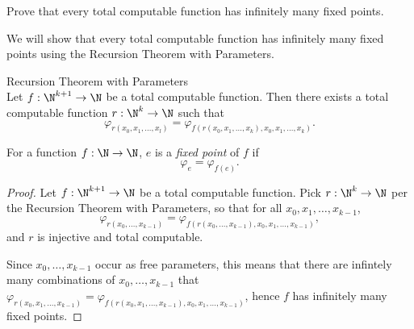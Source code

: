 \begin{problem}
  Prove that every total computable function has
  infinitely many fixed points.

  \begin{answer}

    We will show that every total computable function has infinitely many fixed points
    using the Recursion Theorem with Parameters.

    \begin{theorem}{Recursion Theorem with Parameters} \\
      Let $f : \N^{k+1} \to \N$ be a total computable function.
      Then there exists a total computable function $r : \N^k \to \N$ such that
      \[
        \varphi_{r(x_0, x_1, \ldots, x_l)} = \varphi_{f(r(x_0, x_1, \ldots, x_k), x_0, x_1, \ldots, x_k)}.
      \]
    \end{theorem}


    \begin{definition}
      For a function $f : \N \to \N$, $e$ is a \emph{fixed point} of $f$
      if \[ \varphi_e = \varphi_{f(e)}. \]
    \end{definition}


    \begin{proof}
      Let $f : \N^{k+1} \to \N$ be a total computable function.
      Pick $r : \N^k \to \N$ per the Recursion Theorem with Parameters,
      so that for all $x_0, x_1, \ldots, x_{k-1}$,
      \[
        \varphi_{r(x_0, \ldots, x_{k-1})} = \varphi_{f(r(x_0, \ldots, x_{k-1}), x_0, x_1, \ldots, x_{k-1})},
      \]
      and $r$ is injective and total computable.

      Since $x_0, \ldots, x_{k-1}$ occur as free parameters, this means that
      there are infintely many combinations of $x_0, \ldots, x_{k-1}$ that
      $\varphi_{r(x_0, x_1, \ldots, x_{k-1})} = \varphi_{f(r(x_0, x_1, \ldots, x_{k-1}), x_0, x_1, \ldots, x_{k-1})}$,
      hence $f$ has infinitely many fixed points.
    \end{proof}
  \end{answer}
\end{problem}
